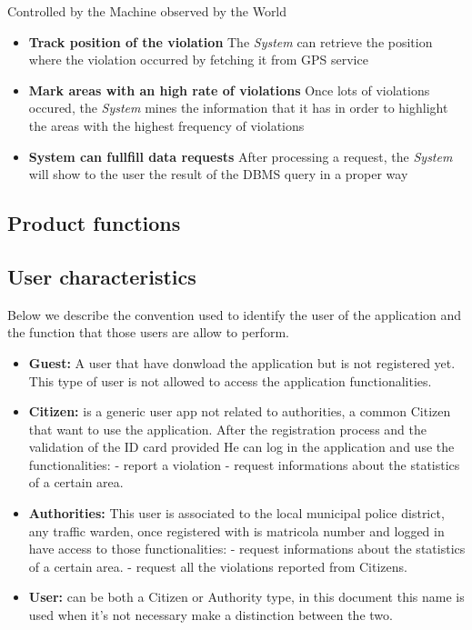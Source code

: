 \documentclass{article}
\begin{document}
Controlled by the Machine observed by the World
\begin{itemize}
    \item\textbf{Track position of the violation}
    The \textit{System} can retrieve the position where the violation occurred by fetching it from GPS service
    \item\textbf{Mark areas with an high rate of violations}
    Once lots of violations occured, the \textit{System} mines the information that it has in order to highlight the areas with the highest frequency of violations
    \item\textbf{System can fullfill data requests}
    After processing a request, the \textit{System} will show to the user the result of the DBMS query in a proper way

\end{itemize}

\subsection{Product functions}
\subsubsection{}

\subsection{User characteristics}
Below we describe the convention used to identify the user of the application and the function that those 
users are allow to perform.
\begin{itemize}
    \item \textbf{Guest:} A user that have donwload the application but is not 
    registered yet. This type of user is not allowed to access 
    the application functionalities.
    \item \textbf{Citizen:} is a generic user app not related to authorities, a 
    common Citizen that want to use the application. After the
    registration process and the validation of the ID card provided
    He can log in the application and use the functionalities:
    - report a violation
    - request informations about the statistics of a certain area.
    \item \textbf{Authorities:} This user is associated to the local municipal
    police district, any traffic warden, once registered with 
    is matricola number and logged in have access to those 
    functionalities:
    - request informations about the statistics of a certain area.
    - request all the violations reported from Citizens. 
    \item \textbf{User:} can be both a Citizen or Authority type, in this document
    this name is used when it's not necessary make a distinction 
    between the two.
\end{itemize}
\end{document}
